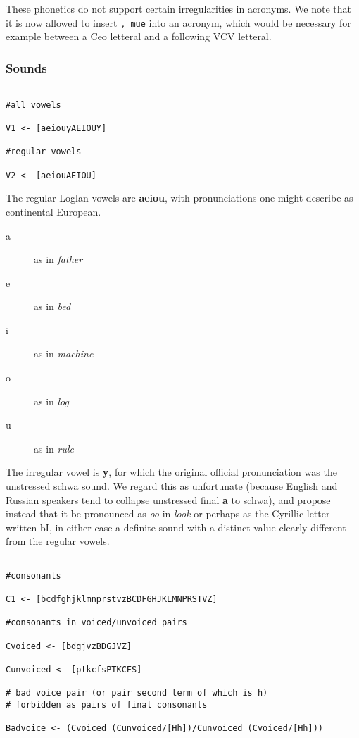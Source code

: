\documentclass{article}
\begin{document}
 These phonetics do not support certain irregularities in acronyms.  We note that
 it is now allowed to insert {\tt, mue} into an acronym, which would be necessary for example
 between a Ceo letteral and a following VCV letteral.

\subsubsection{Sounds}

\begin{verbatim}

#all vowels

V1 <- [aeiouyAEIOUY]

#regular vowels

V2 <- [aeiouAEIOU]

\end{verbatim}

The regular Loglan vowels are {\bf aeiou}, with pronunciations one might describe as continental European.

\begin{description}

\item[a]  as in {\em father\/}

\item[e]  as in {\em bed\/}

\item[i]  as in {\em machine\/}

\item[o]  as in {\em log\/}

\item[u]  as in {\em rule\/}

\end{description}

The irregular vowel is {\bf y}, for which the original official pronunciation was the unstressed schwa sound.  We regard this as unfortunate (because English and Russian speakers
tend to collapse unstressed final {\bf a} to schwa), and propose instead that it be pronounced as {\em oo\/} in {\em look\/} or perhaps as the Cyrillic letter written bI, in either case a definite sound with a distinct value clearly different from the regular vowels.

\begin{verbatim}

#consonants

C1 <- [bcdfghjklmnprstvzBCDFGHJKLMNPRSTVZ]

#consonants in voiced/unvoiced pairs

Cvoiced <- [bdgjvzBDGJVZ]

Cunvoiced <- [ptkcfsPTKCFS]

# bad voice pair (or pair second term of which is h)
# forbidden as pairs of final consonants

Badvoice <- (Cvoiced (Cunvoiced/[Hh])/Cunvoiced (Cvoiced/[Hh]))

\end{verbatim}
\end{document}
